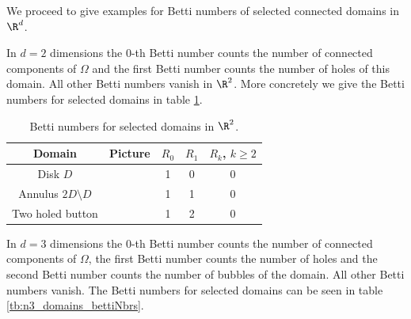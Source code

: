 We proceed to give examples for Betti numbers of selected connected domains in $\R^d$.
\begin{example}[In flatland]
  In $d=2$ dimensions the $0$-th Betti number counts the number of connected components
  of $\Omega$ and the first Betti number counts the number of holes of this domain.
  All other Betti numbers vanish in $\R^2$.
  More concretely we give the Betti numbers for selected domains in table \ref{tb:n2_domains_bettiNbrs}.
\end{example}

\begin{table}
  \centering
  \renewcommand{\arraystretch}{3}
  \begin{tabular}{c|c|c|c|c}
    Domain & Picture & $R_0$ & $R_1$ & $R_k$, $k\geq2$ \\ \hline
    Disk $D$ & 
    \begin{minipage}{0.1\textwidth}
      \def\svgwidth{\textwidth}
      
    \end{minipage}
    & 1 & 0 & 0 \\
    Annulus $2D\setminus D$ & 
    \begin{minipage}{0.1\textwidth}
      \def\svgwidth{\textwidth}
      
    \end{minipage}
    & 1 & 1 & 0 \\
    Two holed button & 
    \begin{minipage}{0.1\textwidth}
      \def\svgwidth{\textwidth}
      
    \end{minipage}
    & 1 & 2 & 0 \\
  \end{tabular}
  \caption{Betti numbers for selected domains in $\R^2$.}
  \label{tb:n2_domains_bettiNbrs}
\end{table}

\begin{example}[In spaceland]
  In $d=3$ dimensions the $0$-th Betti number counts the number of connected components
  of $\Omega$, the first Betti number counts the number of holes and the second Betti number
  counts the number of bubbles of the domain. All other Betti numbers vanish.
  The Betti numbers for selected domains can be seen in table \ref{tb:n3_domains_bettiNbrs}.
\end{example}

